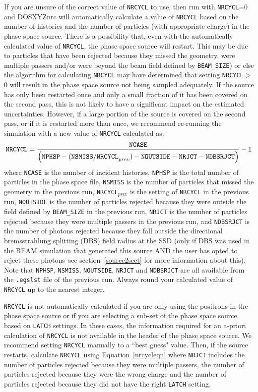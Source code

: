 \documentclass[12pt,twoside]{article}      %
\newcommand{\indexm}[1]{\index{#1}}
\begin{document}
If you are unsure of
the correct value of {\tt NRCYCL} to use, then
run with {\tt NRCYCL}=0 and DOSXYZnrc will automatically calculate
a value of {\tt NRCYCL} based on the number of histories and
the number of particles (with appropriate charge) in the phase space source.
There is a possibility
that, even with the automatically calculated value of {\tt NRCYCL},
the phase space source will restart.  This may be due to particles
that have been rejected because they missed the geometry, were multiple
passers and/or were beyond the beam field defined by {\tt BEAM\_SIZE}) or
else the algorithm for calculating {\tt NRCYCL} may have determined that
setting {\tt NRCYCL}$>$ 0 will result in the phase space source not being
sampled adequately.
If the
source has only been restarted once and only a small fraction of it
has been covered on the second pass, this is not likely to have a significant
impact on the estimated uncertainties.  However, if a large portion of the
source is covered on the second pass, or if it is restarted more than once,
we recommend re-running the simulation with a new value of
{\tt NRCYCL} calculated as:
\begin{eqnarray}
\label{nrcycleqn}
{\tt
NRCYCL}=
\frac{{\tt NCASE}}{\left({\tt NPHSP - (NSMISS/NRCYCL}_{prev}) - {\tt NOUTSIDE - NRJCT - NDBSRJCT}\right)}-1
\end{eqnarray}
where {\tt NCASE} is the number of incident histories, {\tt NPHSP} is the
total number of particles in the phase space file, {\tt NSMISS} is
the number of particles that missed the geometry in the previous run,
{\tt NRCYCL$_{prev}$} is the setting of {\tt NRCYCL} in the previous run,
{\tt NOUTSIDE} is the number of particles rejected because they were
outside the field defined by {\tt BEAM\_SIZE} in the previous run,
{\tt NRJCT} is the number of particles rejected because they were
multiple passers in the previous run, and {\tt NDBSRJCT} is the number of
photons rejected because they fall outside the directional bremsstrahlung
splitting (DBS) field radius at the SSD (only if DBS was used in the BEAM
simulation that generated this source AND the user has opted to reject
these photons--see section~\ref{source2sect} for more information about
this).  Note that {\tt NPHSP}, {\tt NSMISS}, {\tt NOUTSIDE},
{\tt NRJCT} and {\tt NDBSRJCT} are all available from the {\tt .egslst} file of the previous run.
Always round your calculated value of {\tt NRCYCL} up to the nearest integer.
\indexm{DBS}
\indexm{NRCYCL}

{\tt NRCYCL} is not automatically calculated if you are only using the
positrons in the phase space source or if you are selecting a sub-set of
the phase space source based on {\tt LATCH} settings.  In these cases,
the information required for an a-priori calculation of {\tt NRCYCL}
is not available in the header of the phase space source.
We recommend setting {\tt NRCYCL} manually to a ``best guess" value.  Then,
if the source restarts, calculate {\tt NRCYCL} using Equation~\ref{nrcycleqn}
where {\tt NRJCT} includes the number of particles rejected because they
were multiple passers, the number of particles rejected because they were
the wrong charge and the number of particles rejected because they did not
have the right {\tt LATCH} setting.
\end{document}
